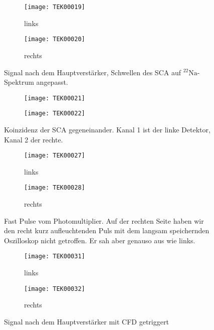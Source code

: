 \documentclass[11pt, ngerman, fleqn, DIV=15, headinclude, BCOR=2cm]{scrreprt}
\begin{document}
\begin{figure}
	\centering
	\begin{subfigure}{0.49 \textwidth}
		\texttt{[image: TEK00019]}
		\caption{%
			links
		}
		\label{fig:slow_signal_sca_eingestellt-li}
	\end{subfigure}
	\begin{subfigure}{0.49 \textwidth}
		\texttt{[image: TEK00020]}
		\caption{%
			rechts
		}
		\label{fig:slow_signal_sca_eingestellt-re}
	\end{subfigure}
	\caption{%
		Signal nach dem Hauptverstärker, Schwellen des SCA auf
		$^{22}\text{Na}$-Spektrum angepasst.
	}
	\label{fig:slow_signal_sca_eingestellt}
\end{figure}

\fehlt%

\begin{figure}
	\centering
	\begin{subfigure}{0.49 \textwidth}
		\texttt{[image: TEK00021]}
	\end{subfigure}
	\begin{subfigure}{0.49 \textwidth}
		\texttt{[image: TEK00022]}
	\end{subfigure}
	\caption{%
		Koinzidenz der SCA gegeneinander. Kanal 1 ist der linke
		Detektor, Kanal 2 der rechte.
	}
	\label{fig:slow_signal_sca_koinzidenz}
\end{figure}



\begin{figure}
	\centering
	\begin{subfigure}{0.49 \textwidth}
		\texttt{[image: TEK00027]}
		\caption{%
			links
		}
		\label{fig:fast_signal-li}
	\end{subfigure}
	\begin{subfigure}{0.49 \textwidth}
		\texttt{[image: TEK00028]}
		\caption{%
			rechts
		}
		\label{fig:fast_signal-re}
	\end{subfigure}
	\caption{%
		Fast Pulse vom Photomultiplier. Auf der rechten Seite haben wir
		den recht kurz aufleuchtenden Puls mit dem langsam speichernden
		Oszilloskop nicht getroffen. Er sah aber genauso aus wie links.
	}
	\label{fig:fast_signal}
\end{figure}

\begin{figure}
	\centering
	\begin{subfigure}{0.49 \textwidth}
		\texttt{[image: TEK00031]}
		\caption{%
			links
		}
		\label{fig:fast_signal_cfd_trig-li}
	\end{subfigure}
	\begin{subfigure}{0.49 \textwidth}
		\texttt{[image: TEK00032]}
		\caption{%
			rechts
		}
		\label{fig:fast_signal_cfd_trig-re}
	\end{subfigure}
	\caption{%
		Signal nach dem Hauptverstärker mit CFD getriggert
	}
	\label{fig:fast_signal_cfd_trig}
\end{figure}
\end{document}
